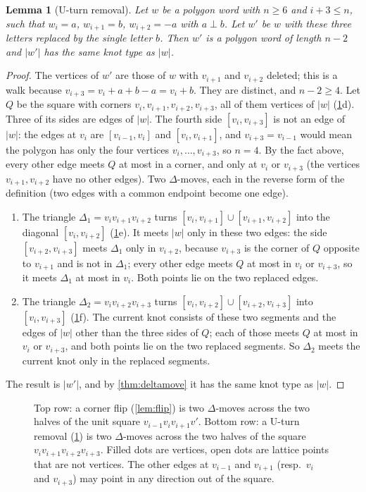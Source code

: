 \documentclass[11pt]{article}
\theoremstyle{plain}
\newtheorem{lemma}[theorem]{Lemma}
\theoremstyle{definition}
\theoremstyle{remark}
\begin{document}
\begin{lemma}[U-turn removal]\label{lem:uturn}
Let $w$ be a polygon word with $n\ge6$ and $i+3\le n$, such that $w_i=a$, $w_{i+1}=b$, $w_{i+2}=-a$
with $a\perp b$. Let $w'$ be $w$ with these three letters replaced by the single letter $b$. Then $w'$
is a polygon word of length $n-2$ and $|w'|$ has the same knot type as $|w|$.
\end{lemma}
\begin{proof}
The vertices of $w'$ are those of $w$ with $v_{i+1}$ and $v_{i+2}$ deleted; this is a walk because
$v_{i+3}=v_i+a+b-a=v_i+b$. They are distinct, and $n-2\ge4$. Let $Q$ be the square with corners
$v_i,v_{i+1},v_{i+2},v_{i+3}$, all of them vertices of $|w|$ (\cref{fig:flipdelta}d). Three of its
sides are edges of $|w|$. The fourth side $[v_i,v_{i+3}]$ is not an edge of $|w|$: the edges at $v_i$ are
$[v_{i-1},v_i]$ and $[v_i,v_{i+1}]$, and $v_{i+3}=v_{i-1}$ would mean the polygon has only the four
vertices $v_i,\dots,v_{i+3}$, so $n=4$. By the fact above, every other edge meets $Q$ at most in a
corner, and only at $v_i$ or $v_{i+3}$ (the vertices $v_{i+1},v_{i+2}$ have no other edges). Two
$\Delta$-moves, each in the reverse form of the definition (two edges with a common endpoint become
one edge).
\begin{enumerate}
\item The triangle $\Delta_1=v_iv_{i+1}v_{i+2}$ turns $[v_i,v_{i+1}]\cup[v_{i+1},v_{i+2}]$ into the
diagonal $[v_i,v_{i+2}]$ (\cref{fig:flipdelta}e). It meets $|w|$ only in these two edges: the side
$[v_{i+2},v_{i+3}]$ meets $\Delta_1$ only in $v_{i+2}$, because $v_{i+3}$ is the corner of $Q$ opposite to
$v_{i+1}$ and is not in $\Delta_1$; every other edge meets $Q$ at most in $v_i$ or $v_{i+3}$, so it meets
$\Delta_1$ at most in $v_i$. Both points lie on the two replaced edges.
\item The triangle $\Delta_2=v_iv_{i+2}v_{i+3}$ turns $[v_i,v_{i+2}]\cup[v_{i+2},v_{i+3}]$ into
$[v_i,v_{i+3}]$ (\cref{fig:flipdelta}f). The current knot consists of these two segments and the edges
of $|w|$ other than the three sides of $Q$; each of those meets $Q$ at most in $v_i$ or $v_{i+3}$, and
both points lie on the two replaced segments. So $\Delta_2$ meets the current knot only in the
replaced segments.
\end{enumerate}
The result is $|w'|$, and by \cref{thm:deltamove} it has the same knot type as $|w|$.
\end{proof}

\begin{figure}[t]
\centering
\FigFlipDelta
\caption{Top row: a corner flip (\cref{lem:flip}) is two $\Delta$-moves across the two halves of the
unit square $v_{i-1}v_iv_{i+1}v'$. Bottom row: a U-turn removal (\cref{lem:uturn}) is two
$\Delta$-moves across the two halves of the square $v_iv_{i+1}v_{i+2}v_{i+3}$. Filled dots are
vertices, open dots are lattice points that are not vertices. The other edges at $v_{i-1}$ and
$v_{i+1}$ (resp.\ $v_i$ and $v_{i+3}$) may point in any direction out of the square.}
\label{fig:flipdelta}
\end{figure}
\end{document}
